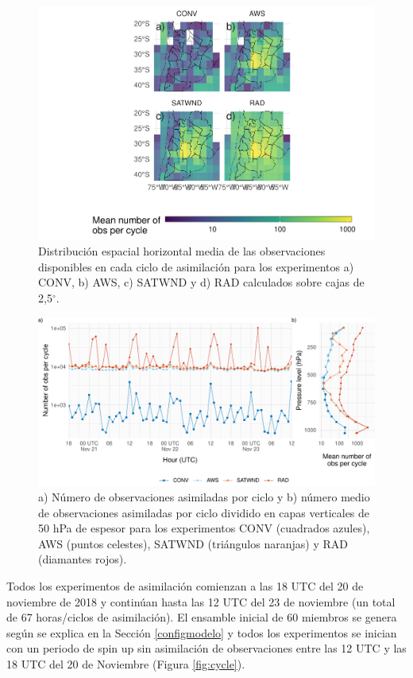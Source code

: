 \documentclass[12pt,oneside,a4paper]{reedthesis}
\begin{document}
\begin{figure}
\includegraphics{thesis_files/figure-latex/obs-horizontal-1} \caption{Distribución espacial horizontal media de las observaciones disponibles en cada ciclo de asimilación para los experimentos a) CONV, b) AWS, c) SATWND y d) RAD calculados sobre cajas de 2,5\(^{\circ}\).}\label{fig:obs-horizontal}
\end{figure}

\begin{figure}
\includegraphics{thesis_files/figure-latex/obs-cycle-1} \caption{a) Número de observaciones asimiladas por ciclo y b) número medio de observaciones asimiladas por ciclo dividido en capas verticales de 50 hPa de espesor para los experimentos CONV (cuadrados azules), AWS (puntos celestes), SATWND (triángulos naranjas) y RAD (diamantes rojos).}\label{fig:obs-cycle}
\end{figure}
Todos los experimentos de asimilación comienzan a las 18 UTC del 20 de noviembre de 2018 y continúan hasta las 12 UTC del 23 de noviembre (un total de 67 horas/ciclos de asimilación). El ensamble inicial de 60 miembros se genera según se explica en la Sección \ref{configmodelo} y todos los experimentos se inician con un periodo de spin up sin asimilación de observaciones entre las 12 UTC y las 18 UTC del 20 de Noviembre (Figura \ref{fig:cycle}).
\end{document}
